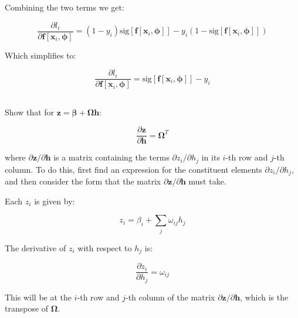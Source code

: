 \documentclass[12pt]{report}
\begin{document}
Combining the two terms we get:

\begin{equation*}
    \frac{\partial l_{i}}{\partial \mathbf{f}[\mathbf{x}_{i}, \boldsymbol{\phi}]} = (1-y_{i})\text{sig}[\mathbf{f}[\mathbf{x}_{i}, \boldsymbol{\phi}]]-y_{i}(1 - \text{sig}[\mathbf{f}[\mathbf{x}_{i}, \boldsymbol{\phi}]])
\end{equation*}

Which simplifies to:

\begin{equation*}
    \frac{\partial l_{i}}{\partial \mathbf{f}[\mathbf{x}_{i}, \boldsymbol{\phi}]} = \text{sig}[\mathbf{f}[\mathbf{x}_{i}, \boldsymbol{\phi}]] - y_{i}
\end{equation*}


\subsection{}
\begin{mdframed}
    Show that for $\mathbf{z} = \boldsymbol{\beta} + \boldsymbol{\Omega}\mathbf{h}$:

    \begin{equation*}
        \frac{\partial \mathbf{z}}{\partial \mathbf{h}} = \boldsymbol{\Omega}^{T}
    \end{equation*}

    where $\partial \mathbf{z} / \partial \mathbf{h}$ is a matrix containing the terms $\partial z_{i} / \partial h_{j}$ in its $i$-th row and $j$-th column. To do this, first find an expression for the constituent elements $\partial z_{i} / \partial h_{j}$, and then consider the form that the matrix $\partial \mathbf{z} / \partial \mathbf{h}$ must take.
\end{mdframed}

Each $z_{i}$ is given by:

\begin{equation*}
    z_{i} = \beta_{i} + \sum_{j} \omega_{ij}h_{j}
\end{equation*}

The derivative of $z_{i}$ with respect to $h_{j}$ is:

\begin{equation*}
    \frac{\partial z_{i}}{\partial h_{j}} = \omega_{ij}
\end{equation*}

This will be at the $i$-th row and $j$-th column of the matrix $\partial \mathbf{z} / \partial \mathbf{h}$, which is the transpose of $\boldsymbol{\Omega}$.
\end{document}
